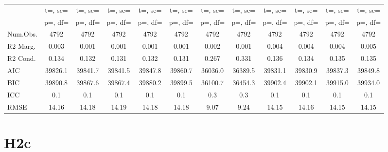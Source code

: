 \documentclass[]{report}
\begin{document}
\begin{table}
{\begin{tabular}[t]{lccccccccccc}
		& t=, se= & t=, se= & t=, se= & t=, se= & t=, se= & t=, se= & t=, se= & t=, se= & t=, se= & t=, se= & t=, se=\\
		& p=, df= & p=, df= & p=, df= & p=, df= & p=, df= & p=, df= & p=, df= & p=, df= & p=, df= & p=, df= & p=, df=\\
		\midrule
		Num.Obs. & \num{4792} & \num{4792} & \num{4792} & \num{4792} & \num{4792} & \num{4792} & \num{4792} & \num{4792} & \num{4792} & \num{4792} & \num{4792}\\
		R2 Marg. & \num{0.003} & \num{0.001} & \num{0.001} & \num{0.001} & \num{0.001} & \num{0.002} & \num{0.001} & \num{0.004} & \num{0.004} & \num{0.004} & \num{0.005}\\
		R2 Cond. & \num{0.134} & \num{0.132} & \num{0.131} & \num{0.132} & \num{0.131} & \num{0.267} & \num{0.331} & \num{0.136} & \num{0.134} & \num{0.135} & \num{0.135}\\
		AIC & \num{39826.1} & \num{39841.7} & \num{39841.5} & \num{39847.8} & \num{39860.7} & \num{36036.0} & \num{36389.5} & \num{39831.1} & \num{39830.9} & \num{39837.3} & \num{39849.8}\\
		BIC & \num{39890.8} & \num{39867.6} & \num{39867.4} & \num{39880.2} & \num{39899.5} & \num{36100.7} & \num{36454.3} & \num{39902.4} & \num{39902.1} & \num{39915.0} & \num{39934.0}\\
		ICC & \num{0.1} & \num{0.1} & \num{0.1} & \num{0.1} & \num{0.1} & \num{0.3} & \num{0.3} & \num{0.1} & \num{0.1} & \num{0.1} & \num{0.1}\\
		RMSE & \num{14.16} & \num{14.18} & \num{14.19} & \num{14.18} & \num{14.18} & \num{9.07} & \num{9.24} & \num{14.15} & \num{14.16} & \num{14.15} & \num{14.15}\\
		\bottomrule
	\end{tabular}}
\end{table}


\section{H2c}
\end{document}
